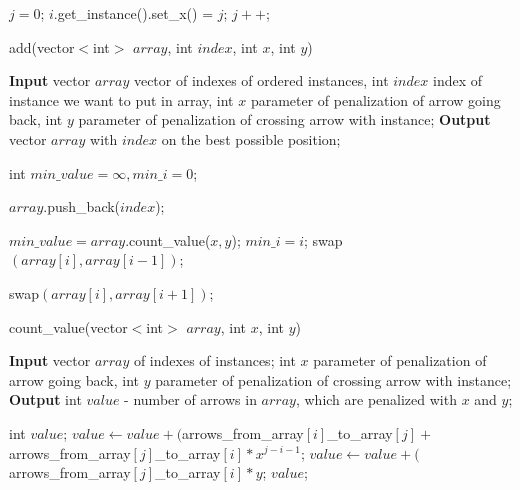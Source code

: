 \documentclass{article}
\begin{document}
\begin{algorithmic}[1]
\STATE {}
\STATE $j = 0$;
\STATE $i$.get\_instance().set\_x() = $j$;
\STATE $j++$;
\ENDFOR



\end{algorithmic}

\begin{algorithm}
\caption{add(vector$<$int$>$ $array$,  int $index$, int $x$, int $y$)}
\begin{algorithmic}[1]

\STATE \textbf{Input} vector $array$ vector of indexes of ordered instances, int $index$ index of instance we want to put in array, int $x$ parameter of penalization of arrow going back, int $y$ parameter of penalization of crossing arrow with instance;
\STATE \textbf{Output} vector $array$ with $index$ on the best possible position;
\STATE

\STATE int $min\_value = \infty, min\_i=0$;
\STATE
\STATE {}

\STATE $array$.push\_back($index$);
\STATE {}

\STATE $min\_value = array$.count\_value($x,y$);
\STATE $min\_i = i$;
\ENDIF
\STATE swap$(array[i], array[i-1])$;
\ENDFOR

\STATE
{}
\STATE swap$(array[i],array[i+1])$;
\ENDFOR

\end{algorithmic}
\end{algorithm}



\begin{algorithm}
\caption{count\_value(vector$<$int$>$ $array$, int $x$, int $y$)}
\begin{algorithmic}[1]

\STATE \textbf{Input} vector $array$ of indexes of instances; int $x$ parameter of penalization of arrow going back, int $y$ parameter of penalization of crossing arrow with instance;
\STATE \textbf{Output} int $value$ - number of arrows in $array$, which are penalized with $x$ and $y$;
\STATE

\STATE int $value$;
\STATE {}
\STATE $value \leftarrow value + ($arrows\_from\_array$[i]$\_to\_array$[j] + $ \linebreak arrows\_from\_array$[j]$\_to\_array$[i]*x^{j-i-1}$;
\ENDIF
\STATE {}
\STATE $value \leftarrow value + ($arrows\_from\_array$[j]$\_to\_array$[i] * y$;
\ENDFOR
\ENDFOR
\STATE
\RETURN $value$;

\end{algorithmic}
\end{algorithm}
\end{document}
